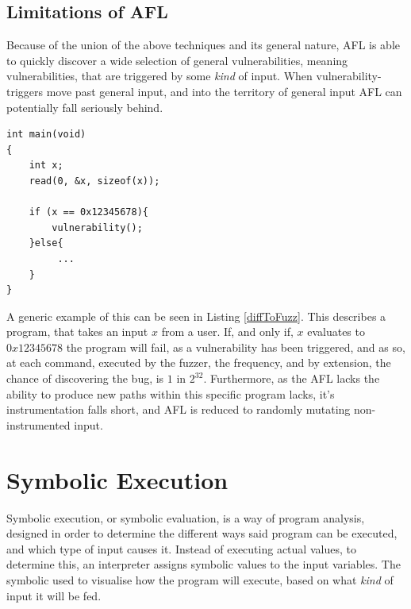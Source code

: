 \documentclass[a4paper]{article}
\newcommand{\tit}[1]{\textit{#1}}
\begin{document}
\subsection{Limitations of AFL}
Because of the union of the above techniques and its general nature, AFL is able to quickly discover a wide selection of general vulnerabilities, meaning vulnerabilities, that are triggered by some \tit{kind} of input. When vulnerability-triggers move past general input, and into the territory of general input AFL can potentially fall seriously behind.
\begin{lstlisting}[caption=A program that is difficult to fuzz, label=diffToFuzz, captionpos=b]
int main(void)
{
    int x;
    read(0, &x, sizeof(x));
    
    if (x == 0x12345678){
        vulnerability();
    }else{
         ...
    }
}
\end{lstlisting}
A generic example of this can be seen in Listing \ref{diffToFuzz}. This describes a program, that takes an input $x$ from a user. If, and only if, $x$ evaluates to $0x12345678$ the program will fail, as a vulnerability has been triggered, and as so, at each command, executed by the fuzzer, the frequency, and by extension, the chance of discovering the bug, is $1$ in $2^{32}$. Furthermore, as the AFL lacks the ability to produce new paths within this specific program lacks, it's instrumentation falls short, and AFL is reduced to randomly mutating non-instrumented input.
\section{Symbolic Execution}
Symbolic execution, or symbolic evaluation, is a way of program analysis, designed in order to determine the different ways said program can be executed, and which type of input causes it. Instead of executing actual values, to determine this, an interpreter assigns symbolic values to the input variables. The symbolic used to visualise how the program will execute, based on what \tit{kind} of input it will be fed.
\end{document}
